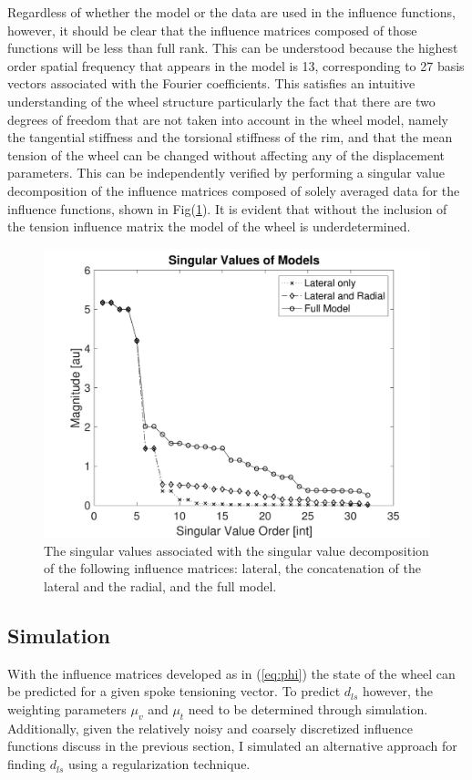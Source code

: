 \documentclass[journal]{IEEEtran}
\begin{document}
Regardless of whether the model or the data are used in the influence functions, however, it should be clear that the influence matrices composed of those functions will be less than full rank.  This can be understood because the highest order spatial frequency that appears in the model is 13, corresponding to 27 basis vectors associated with the Fourier coefficients. This satisfies an intuitive understanding of the wheel structure particularly the fact that there are two degrees of freedom that are not taken into account in the wheel model, namely the tangential stiffness and the torsional stiffness of the rim, and that the mean tension of the wheel can be changed without affecting any of the displacement parameters. This can be independently verified by performing a singular value decomposition of the influence matrices composed of solely averaged data for the influence functions, shown in Fig(\ref{fig:svd}). It is evident that without the inclusion of the tension influence matrix the model of the wheel is underdetermined.  

\begin{figure}[!t]
\centering
\includegraphics[width=3.25 in]{./figs/svd}
\caption{The singular values associated with the singular value decomposition of the following influence matrices: lateral, the concatenation of the lateral and the radial, and the full model.}
\label{fig:svd}
\end{figure}

\subsection{Simulation}
With the influence matrices developed as in (\ref{eq:phi}) the state of the wheel can be predicted for a given spoke tensioning vector. To predict $d_{ls}$ however, the weighting parameters $\mu_v$ and $\mu_t$ need to be determined through simulation. Additionally, given the relatively noisy and coarsely discretized influence functions discuss in the previous section, I simulated an alternative approach for finding $d_{ls}$ using a regularization technique.  
\end{document}
